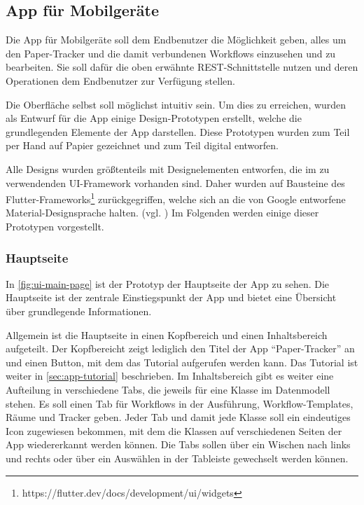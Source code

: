 
\FloatBarrier
\subsection{App für Mobilgeräte} \label{sec:app}

Die App für Mobilgeräte soll dem Endbenutzer die Möglichkeit geben, alles um den Paper-Tracker und die damit verbundenen Workflows einzusehen und zu bearbeiten.
Sie soll dafür die oben erwähnte \gls{REST}-Schnittstelle nutzen und deren Operationen dem Endbenutzer zur Verfügung stellen.

Die Oberfläche selbst soll möglichst intuitiv sein.
Um dies zu erreichen, wurden als Entwurf für die App einige Design-Prototypen erstellt, welche die grundlegenden Elemente der App darstellen.
Diese Prototypen wurden zum Teil per Hand auf Papier gezeichnet und zum Teil digital entworfen.

Alle Designs wurden größtenteils mit Designelementen entworfen, die im zu verwendenden \gls{UI}-Framework vorhanden sind.
Daher wurden auf Bausteine des
Flutter-Frameworks\footnote{https://flutter.dev/docs/development/ui/widgets} zurückgegriffen, welche
sich an die von Google entworfene Material-Designsprache halten. (vgl. \cite{Google2020})
Im Folgenden werden einige dieser Prototypen vorgestellt.

\FloatBarrier
\subsubsection{Hauptseite}

In \autoref{fig:ui-main-page} ist der Prototyp der Hauptseite der App zu sehen.
Die Hauptseite ist der zentrale Einstiegspunkt der App und bietet eine Übersicht über grundlegende
Informationen.

Allgemein ist die Hauptseite in einen Kopfbereich und einen Inhaltsbereich aufgeteilt.
Der Kopfbereicht zeigt lediglich den Titel der App \enquote{Paper-Tracker} an und einen Button, mit dem das Tutorial aufgerufen werden kann.
Das Tutorial ist weiter in \autoref{sec:app-tutorial} beschrieben.
Im Inhaltsbereich gibt es weiter eine Aufteilung in verschiedene Tabs, die jeweils für eine Klasse im Datenmodell stehen.
Es soll einen Tab für Workflows in der Ausführung, Workflow-Templates, Räume und Tracker geben.
Jeder Tab und damit jede Klasse soll ein eindeutiges Icon zugewiesen bekommen, mit dem die Klassen auf verschiedenen Seiten der App wiedererkannt werden können.
Die Tabs sollen über ein Wischen nach links und rechts oder über ein Auswählen in der Tableiste gewechselt werden können.

